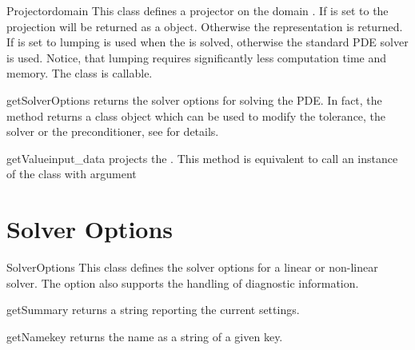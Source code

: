 \begin{classdesc}{Projector}{domain}
This class defines a projector on the domain .
If  is set to \True the projection will be returned as a
\ReducedSolutionFS \Data object.
Otherwise the \SolutionFS representation is returned.
If  is set to \True lumping is used when the  is
solved, otherwise the standard PDE solver is used.
Notice, that lumping requires significantly less computation time and memory.
The class is callable.
\end{classdesc}

\begin{methoddesc}[Projector]{getSolverOptions}{}
returns the solver options for solving the PDE. In fact, the method returns
a \SolverOptions class object which can be used to modify the tolerance,
the solver or the preconditioner, see  for details.
\end{methoddesc}

\begin{methoddesc}[Projector]{getValue}{input_data}
projects the . This method is equivalent to call an instance
of the class with argument 
\end{methoddesc}


\section{Solver Options}
\label{SEC Solver Options}

\begin{classdesc}{SolverOptions}{}
This class defines the solver options for a linear or non-linear solver.
The option also supports the handling of diagnostic information.
\end{classdesc}

\begin{methoddesc}[SolverOptions]{getSummary}{}
returns a string reporting the current settings.
\end{methoddesc}

\begin{methoddesc}[SolverOptions]{getName}{key}
returns the name as a string of a given key.
\end{methoddesc}

